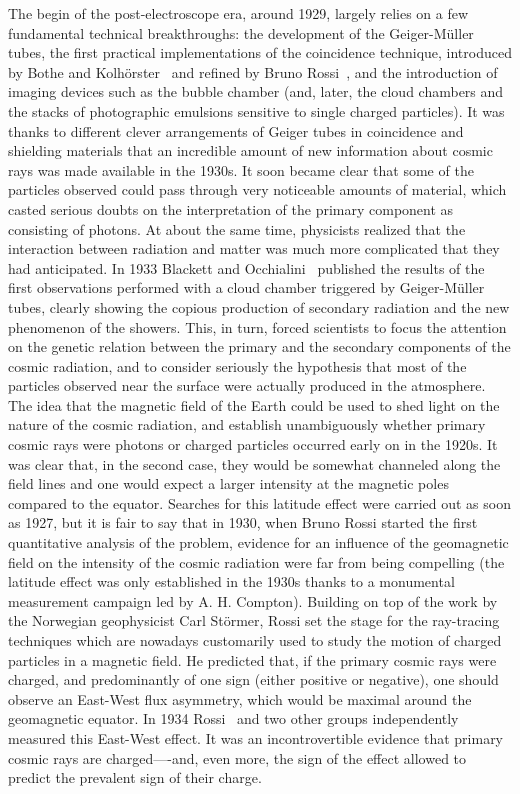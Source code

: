 The begin of the post-electroscope era, around 1929, largely relies on a few fundamental
technical breakthroughs: the development of the Geiger-M\"uller tubes, the first
practical implementations of the coincidence technique, introduced by Bothe and
Kolh\"orster~\cite{45} and refined by Bruno Rossi~\cite{46}, and the introduction
of imaging devices such as the bubble chamber (and, later, the cloud chambers and
the stacks of photographic emulsions sensitive to single charged particles).
It was thanks to different clever arrangements of Geiger tubes in coincidence and
shielding materials that an incredible amount of new information about cosmic rays
was made available in the 1930s. It soon became clear that some of the particles
observed could pass through very noticeable amounts of material, which casted serious
doubts on the interpretation of the primary component as consisting of photons.
At about the same time, physicists realized that the interaction between radiation
and matter was much more complicated that they had anticipated. In 1933 Blackett
and Occhialini~\cite{47} published the results of the first observations performed
with a cloud chamber triggered by Geiger-M\"uller tubes, clearly showing the copious
production of secondary radiation and the new phenomenon of the showers. This, in
turn, forced scientists to focus the attention on the genetic relation between the
primary and the secondary components of the cosmic radiation, and to consider seriously
the hypothesis that most of the particles observed near the surface were actually
produced in the atmosphere. The idea that the magnetic field of the Earth could be
used to shed light on the nature of the cosmic radiation, and establish unambiguously
whether primary cosmic rays were photons or charged particles occurred early on in
the 1920s. It was clear that, in the second case, they would be somewhat channeled
along the field lines and one would expect a larger intensity at the magnetic poles
compared to the equator. Searches for this latitude effect were carried out as soon
as 1927, but it is fair to say that in 1930, when Bruno Rossi started the first
quantitative analysis of the problem, evidence for an influence of the geomagnetic
field on the intensity of the cosmic radiation were far from being compelling
(the latitude effect was only established in the 1930s thanks to a monumental
measurement campaign led by A. H. Compton). Building on top of the work by the Norwegian
geophysicist Carl St\"ormer, Rossi set the stage for the ray-tracing techniques
which are nowadays customarily used to study the motion of charged particles in a
magnetic field. He predicted that, if the primary cosmic rays were charged, and
predominantly of one sign (either positive or negative), one should observe an
East-West flux asymmetry, which would be maximal around the geomagnetic equator.
In 1934 Rossi~\cite{48} and two other groups independently measured this East-West
effect. It was an incontrovertible evidence that primary cosmic rays are
charged----and, even more, the sign of the effect allowed to predict the prevalent
sign of their charge.

